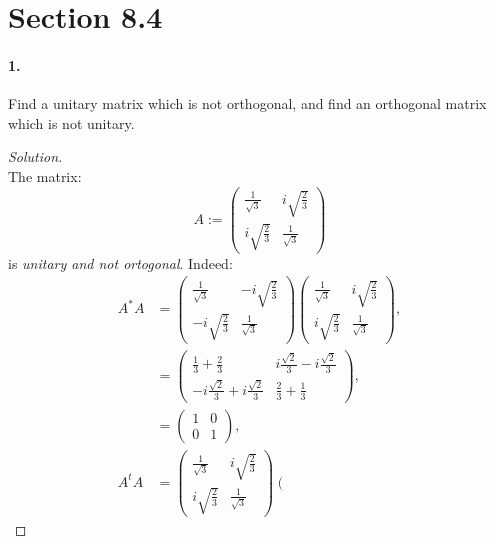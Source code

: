 \documentclass{article}
\theoremstyle{plain}
\theoremstyle{definition}
\theoremstyle{remark}
\begin{document}
  \section*{Section 8.4}

    \paragraph{1.}
    Find a unitary matrix which is not orthogonal, and find an orthogonal matrix which is not unitary.
      \begin{proof}[Solution]$ $\\
        The matrix:
        $$ A:=\left( \begin{matrix}
            \frac{1}{\sqrt{3}} & i\sqrt{\frac{2}{3}} \\
            i\sqrt{\frac{2}{3}}        & \frac{1}{\sqrt{3}}
        \end{matrix} \right)$$
        is \textit{unitary and not ortogonal}. Indeed:
        \begin{align*}
          A^* A & = \left(\begin{matrix}
          \frac{1}{\sqrt{3}} & -i\sqrt{\frac{2}{3}} \\
          -i\sqrt{\frac{2}{3}}        & \frac{1}{\sqrt{3}}
          \end{matrix} \right)\left(\begin{matrix}
          \frac{1}{\sqrt{3}} & i\sqrt{\frac{2}{3}} \\
          i\sqrt{\frac{2}{3}}        & \frac{1}{\sqrt{3}}
          \end{matrix}\right),\\
          & = \left( \begin{matrix}
              \frac{1}{3} + \frac{2}{3} &  i\frac{\sqrt{2}}{3} - i\frac{\sqrt{2}}{3}\\
              -i\frac{\sqrt{2}}{3} + i\frac{\sqrt{2}}{3}& \frac{2}{3} + \frac{1}{3}
          \end{matrix} \right),\\
          &= \left( \begin{matrix}
              1 & 0\\
              0 & 1
          \end{matrix} \right),\\
          A^t A & = \left(\begin{matrix}
          \frac{1}{\sqrt{3}} & i\sqrt{\frac{2}{3}} \\
          i\sqrt{\frac{2}{3}}   & \frac{1}{\sqrt{3}}
          \end{matrix} \right)\left(\begin{matrix}

\end{matrix}
\end{align*}
\end{proof}
\end{document}
